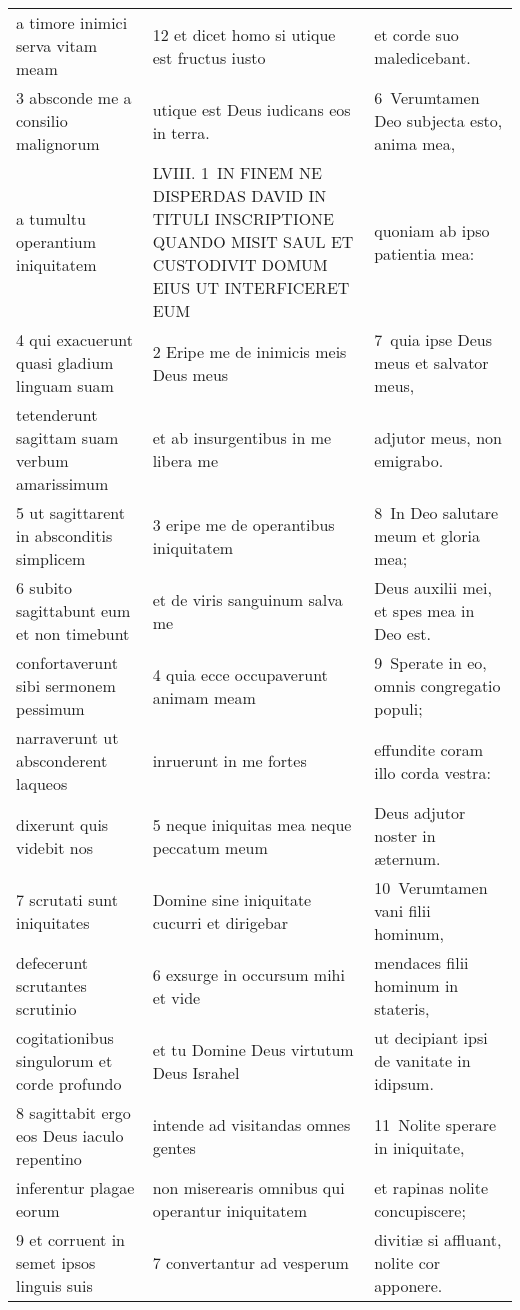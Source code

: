 \documentclass{article}
\begin{document}
\begin{longtable}{@{}p{}p{}p{}@{}}
a timore inimici serva vitam meam	&	12 et dicet homo si utique est fructus iusto	&	et corde suo maledicebant.	\\
3 absconde me a consilio malignorum	&	utique est Deus iudicans eos in terra.	&	6 Verumtamen Deo subjecta esto, anima mea,	\\
a tumultu operantium iniquitatem	&	LVIII. 1 IN FINEM NE DISPERDAS DAVID IN TITULI INSCRIPTIONE QUANDO MISIT SAUL ET CUSTODIVIT DOMUM EIUS UT INTERFICERET EUM	&	quoniam ab ipso patientia mea:	\\
4 qui exacuerunt quasi gladium linguam suam	&	2 Eripe me de inimicis meis Deus meus	&	7 quia ipse Deus meus et salvator meus,	\\
tetenderunt sagittam suam verbum amarissimum	&	et ab insurgentibus in me libera me	&	adjutor meus, non emigrabo.	\\
5 ut sagittarent in absconditis simplicem	&	3 eripe me de operantibus iniquitatem	&	8 In Deo salutare meum et gloria mea;	\\
6 subito sagittabunt eum et non timebunt	&	et de viris sanguinum salva me	&	Deus auxilii mei, et spes mea in Deo est.	\\
confortaverunt sibi sermonem pessimum	&	4 quia ecce occupaverunt animam meam	&	9 Sperate in eo, omnis congregatio populi;	\\
narraverunt ut absconderent laqueos	&	inruerunt in me fortes	&	effundite coram illo corda vestra:	\\
dixerunt quis videbit nos	&	5 neque iniquitas mea neque peccatum meum	&	Deus adjutor noster in æternum.	\\
7 scrutati sunt iniquitates	&	Domine sine iniquitate cucurri et dirigebar	&	10 Verumtamen vani filii hominum,	\\
defecerunt scrutantes scrutinio	&	6 exsurge in occursum mihi et vide	&	mendaces filii hominum in stateris,	\\
cogitationibus singulorum et corde profundo	&	et tu Domine Deus virtutum Deus Israhel	&	ut decipiant ipsi de vanitate in idipsum.	\\
8 sagittabit ergo eos Deus iaculo repentino	&	intende ad visitandas omnes gentes	&	11 Nolite sperare in iniquitate,	\\
inferentur plagae eorum	&	non miserearis omnibus qui operantur iniquitatem	&	et rapinas nolite concupiscere;	\\
9 et corruent in semet ipsos linguis suis	&	7 convertantur ad vesperum	&	divitiæ si affluant, nolite cor apponere.	\\

\end{longtable}
\end{document}
